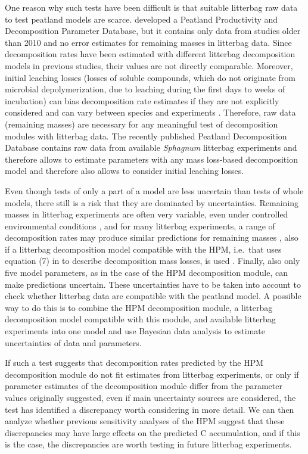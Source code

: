 \documentclass[esd, manuscript]{copernicus}
\begin{document}
One reason why such tests have been difficult is that suitable litterbag raw data to test peatland models are scarce. \citet{Bona.2018} developed a Peatland Productivity and Decomposition Parameter Database, but it contains only data from studies older than 2010 and no error estimates for remaining masses in litterbag data. Since decomposition rates have been estimated with different litterbag decomposition models in previous studies, their values are not directly comparable. Moreover, initial leaching losses (losses of soluble compounds, which do not originate from microbial depolymerization, due to leaching during the first days to weeks of incubation) can bias decomposition rate estimates if they are not explicitly considered and can vary between species and experiments \citep{Yu.2001, Teickner.2025}. Therefore, raw data (remaining masses) are necessary for any meaningful test of decomposition modules with litterbag data. The recently published Peatland Decomposition Database \citep{Teickner.2024c} contains raw data from available \emph{Sphagnum} litterbag experiments and therefore allows to estimate parameters with any mass loss-based decomposition model and therefore also allows to consider initial leaching losses.

Even though tests of only a part of a model are less uncertain than tests of whole models, there still is a risk that they are dominated by uncertainties. Remaining masses in litterbag experiments are often very variable, even under controlled environmental conditions \citep[e.g.,][]{Bengtsson.2018}, and for many litterbag experiments, a range of decomposition rates may produce similar predictions for remaining masses \citep[e.g.,][]{Yu.2001}, also if a litterbag decomposition model compatible with the HPM, i.e.~that uses equation (7) in \citet{Frolking.2010} to describe decomposition mass losses, is used \citep{Teickner.2025}. Finally, also only five model parameters, as in the case of the HPM decomposition module, can make predictions uncertain. These uncertainties have to be taken into account to check whether litterbag data are compatible with the peatland model. A possible way to do this is to combine the HPM decomposition module, a litterbag decomposition model compatible with this module, and available litterbag experiments into one model and use Bayesian data analysis \citep{Gelman.2014} to estimate uncertainties of data and parameters.

If such a test suggests that decomposition rates predicted by the HPM decomposition module do not fit estimates from litterbag experiments, or only if parameter estimates of the decomposition module differ from the parameter values originally suggested, even if main uncertainty sources are considered, the test has identified a discrepancy worth considering in more detail. We can then analyze whether previous sensitivity analyses of the HPM suggest that these discrepancies may have large effects on the predicted C accumulation, and if this is the case, the discrepancies are worth testing in future litterbag experiments.
\end{document}

